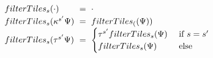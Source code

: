 \begin{figure}
  \newcommand{\spacing}{\ \ \ \ \ }
  \[
  \setlength{\fboxsep}{1pt}
  \arraycolsep=3pt\def\arraystretch{1.25}\begin{array}{lcl}
      \filterTiles{s}{\cdot} & = & \cdot \\
      \filterTiles{s}{\token^{s'}\selection} & = & \filterTiles(\selection) \\
      \filterTiles{s}{\tile^{s'}\selection} & = &
        \begin{cases}
          \tile^{s'}\filterTiles{s}{\selection} & \text{ if } s = s' \\
          \filterTiles{s}{\selection} & \text{ else }
        \end{cases}
\end{array}\]
  \vspace{-2px}
  \vspace{-2px}
  \end{figure}